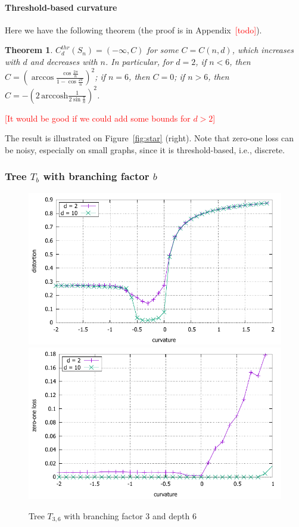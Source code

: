 \documentclass{article} %
\newtheorem{theorem}{Theorem}[section]
\begin{document}
\paragraph{Threshold-based curvature} 
Here we have the following theorem (the proof is in Appendix~\textcolor{red}{[todo]}).

\begin{theorem}\label{thm:star_threshold}
$C_d^{thr}(S_n) = (-\infty, C)$ for some $C = C(n,d)$, which increases with $d$ and decreases with $n$. In particular, for $d = 2$, if $n < 6$, then $C = \left(\arccos \frac{\cos \frac{2\pi}{n}}{1 - \cos \frac{2\pi}{n}}\right)^2$; if $n = 6$, then $C = 0$; if $n > 6$, then $C = - \left(2\,\mathrm{arccosh}\frac{1}{2\sin \frac{\pi}{n}}\right)^2$.
\end{theorem}

\textcolor{red}{[It would be good if we could add some bounds for $d > 2$]}

The result is illustrated on Figure~\ref{fig:star} (right). Note that zero-one loss can be noisy, especially on small graphs, since it is threshold-based, i.e., discrete.

\subsubsection{Tree $T_b$ with branching factor $b$}

\begin{figure}
    \centering
    \includegraphics[width = 0.49 \textwidth]{tree_3_6_distortion.pdf}
    \includegraphics[width = 0.49 \textwidth]{tree_3_6_zero_one.pdf}
    \caption{Tree $T_{3,6}$ with branching factor $3$ and depth $6$}
    \label{fig:tree}
\end{figure}
\end{document}
